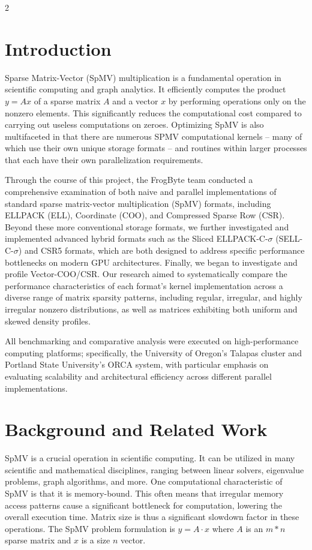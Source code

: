 \documentclass{article}
\begin{document}
\begin{multicols}{2}
\section{Introduction}

Sparse Matrix-Vector (SpMV) multiplication is a fundamental operation in scientific computing and graph analytics. It efficiently computes the product $y = Ax$ of a sparse matrix $A$ and a vector $x$ by performing operations only on the nonzero elements. This significantly reduces the computational cost compared to carrying out useless computations on zeroes. Optimizing SpMV is also multifaceted in that there are numerous SPMV computational kernels – many of which use their own unique storage formats – and routines within larger processes that each have their own parallelization requirements.  \newline


Through the course of this project, the FrogByte team conducted a comprehensive examination of both naive and parallel implementations of standard sparse matrix-vector multiplication (SpMV) formats, including ELLPACK (ELL), Coordinate (COO), and Compressed Sparse Row (CSR). Beyond these more conventional storage formats, we further investigated and implemented advanced hybrid formats such as the Sliced ELLPACK-C-$\sigma$ (SELL-C-$\sigma$) and CSR5 formats, which are both designed to address specific performance bottlenecks on modern GPU architectures. Finally, we began to investigate and profile Vector-COO/CSR. Our research aimed to systematically compare the performance characteristics of each format's kernel implementation across a diverse range of matrix sparsity patterns, including regular, irregular, and highly irregular nonzero distributions, as well as matrices exhibiting both uniform and skewed density profiles. 

All benchmarking and comparative analysis were executed on high-performance computing platforms; specifically, the University of Oregon’s Talapas cluster and Portland State University's ORCA system, with particular emphasis on evaluating scalability and architectural efficiency across different parallel implementations.

\section{Background and Related Work}
SpMV is a crucial operation in scientific computing. It can be utilized in many scientific and mathematical disciplines, ranging between linear solvers, eigenvalue problems, graph algorithms, and more. One computational characteristic of SpMV is that it is memory-bound. This often means that irregular memory access patterns cause a significant bottleneck for computation, lowering the overall execution time. Matrix size is thus a significant slowdown factor in these operations. The SpMV problem formulation is $y = A·x$ where $A$ is an $m*n$ sparse matrix and $x$ is a size $n$ vector. 


\end{multicols}
\end{document}
